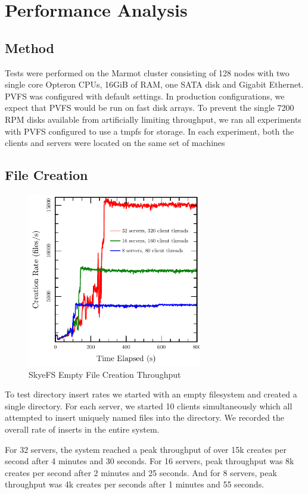 \documentclass[twocolumn,letterpaper]{article}
\begin{document}
\section{Performance Analysis}

\subsection{Method}
Tests were performed on the Marmot cluster consisting of 128 nodes with two
single core Opteron CPUs, 16GiB of RAM, one SATA disk and Gigabit Ethernet.
PVFS was configured with default settings.  In production configurations, we
expect that PVFS would be run on fast disk arrays.  To prevent the single 7200
RPM disks available from artificially limiting throughput, we ran all
experiments with PVFS configured to use a tmpfs for storage.  In each
experiment, both the clients and servers were located on the same set of
machines

\subsection{File Creation}
\begin{figure}
\begin{center}
\includegraphics[width=3in]{graph-create}
\end{center}
\caption{SkyeFS Empty File Creation Throughput}
\end{figure}

To test directory insert rates we started with an empty filesystem and created
a single directory.  For each server, we started 10 clients simultaneously
which all attempted to insert uniquely named files into the directory.  We
recorded the overall rate of inserts in the entire system.

For 32 servers, the system reached a peak throughput of over 15k creates per second
after 4 minutes and 30 seconds.  For 16 servers, peak throughput was 8k
creates per second after 2 minutes and 25 seconds.  And for 8 servers, peak
throughput was 4k creates per seconds after 1 minutes and 55 seconds.
\end{document}
